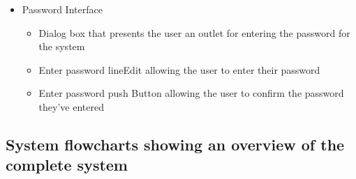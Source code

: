 \begin {itemize}
\begin {itemize}
\begin {itemize}
\begin{itemize}
	    \item A push button allowing the user to confirm they want to print the selected details.
	\end {itemize}
	\item Password Interface
	\begin {itemize}
	    \item Dialog box that presents the user an outlet for entering the password for the system
	    \item Enter password lineEdit allowing the user to enter their password
	    \item Enter password push Button allowing the user to confirm the password they've entered
	\end {itemize}
	\end {itemize}
	\end {itemize}
\end {itemize}

\subsection{System flowcharts showing an overview of the complete system}

